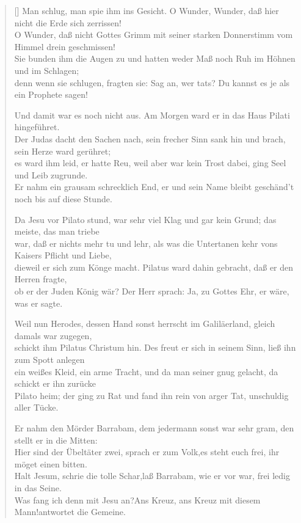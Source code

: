 \begin{center}
\begin{verse}[\versewidth]
 Man schlug, man spie ihm ins Gesicht. O Wunder, Wunder, daß hier nicht die Erde sich zerrissen!\\
O Wunder, daß nicht Gottes Grimm mit seiner starken Donnerstimm vom Himmel drein geschmissen!\\
Sie bunden ihm die Augen zu und hatten weder Maß noch Ruh im Höhnen und im Schlagen;\\
denn wenn sie schlugen, fragten sie: \flqq Sag an, wer tats? Du kannst es je als ein Prophete sagen!\frqq

 Und damit war es noch nicht aus. Am Morgen ward er in das Haus Pilati hingeführet.\\
Der Judas dacht den Sachen nach, sein frecher Sinn sank hin und brach, sein Herze ward gerühret;\\
es ward ihm leid, er hatte Reu, weil aber war kein Trost dabei, ging Seel und Leib zugrunde.\\
Er nahm ein grausam schrecklich End, er und sein Name bleibt geschänd't noch bis auf diese Stunde.

 Da Jesu vor Pilato stund, war sehr viel Klag und gar kein Grund; das meiste, das man triebe\\
war, daß er nichts mehr tu und lehr, als was die Untertanen kehr vons Kaisers Pflicht und Liebe,\\
dieweil er sich zum Könge macht. Pilatus ward dahin gebracht, daß er den Herren fragte,\\
ob er der Juden König wär? Der Herr sprach: Ja, zu Gottes Ehr, er wäre, was er sagte.

\bigskip

 Weil nun Herodes, dessen Hand sonst herrscht im Galiläerland, gleich damals war zugegen,\\
schickt ihm Pilatus Christum hin. Des freut er sich in seinem Sinn, ließ ihn zum Spott anlegen\\
ein weißes Kleid, ein arme Tracht, und da man seiner gnug gelacht, da schickt er ihn zurücke\\
Pilato heim; der ging zu Rat und fand ihn rein von arger Tat, unschuldig aller Tücke.

 Er nahm den Mörder Barrabam, dem jedermann sonst war sehr gram, den stellt er in die Mitten:\\
\flqq Hier sind der Übeltäter zwei\frqq, sprach er zum Volk,\flqq es steht euch frei, ihr möget einen bitten.\frqq \\
\flqq Halt Jesum\frqq, schrie die tolle Schar,\flqq laß Barrabam, wie er vor war, frei ledig in das Seine.\frqq \\
\flqq Was fang ich denn mit Jesu an?\frqq \flqq Ans Kreuz, ans Kreuz mit diesem Mann!\frqq antwortet die Gemeine.


\end{verse}
\end{center}
